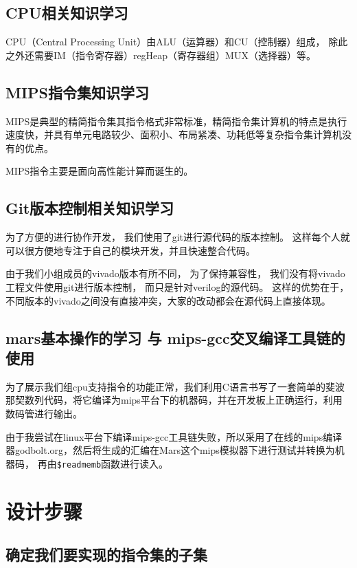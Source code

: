 \documentclass[UTF8]{article}
\begin{document}
\subsection{CPU相关知识学习}
CPU（Central Processing Unit）由ALU（运算器）和CU（控制器）组成，
除此之外还需要IM（指令寄存器）regHeap（寄存器组）MUX（选择器）等。

\subsection{MIPS指令集知识学习}
MIPS是典型的精简指令集其指令格式非常标准，精简指令集计算机的特点是执行速度快，并具有单元电路较少、面积小、布局紧凑、功耗低等复杂指令集计算机没有的优点。

MIPS指令主要是面向高性能计算而诞生的。

\subsection{Git版本控制相关知识学习}

为了方便的进行协作开发，
我们使用了git进行源代码的版本控制。
这样每个人就可以很方便地专注于自己的模块开发，并且快速整合代码。

由于我们小组成员的vivado版本有所不同，
为了保持兼容性，
我们没有将vivado工程文件使用git进行版本控制，
而只是针对verilog的源代码。
这样的优势在于，不同版本的vivado之间没有直接冲突，大家的改动都会在源代码上直接体现。

\subsection{mars基本操作的学习 与 mips-gcc交叉编译工具链的使用}

为了展示我们组cpu支持指令的功能正常，我们利用C语言书写了一套简单的斐波那契数列代码，将它编译为mips平台下的机器码，并在开发板上正确运行，利用数码管进行输出。

由于我尝试在linux平台下编译mips-gcc工具链失败，所以采用了在线的mips编译器godbolt.org，然后将生成的汇编在Mars这个mips模拟器下进行测试并转换为机器码，
再由\lstinline{$readmemb}函数进行读入。

\section{设计步骤}

\subsection{确定我们要实现的指令集的子集}
\end{document}
